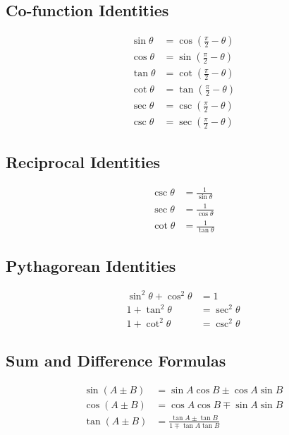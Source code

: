 \documentclass[12pt]{article}
\begin{document}
\subsection*{Co-function Identities}

\begin{align}
  \sin \theta &= \cos \left( \frac{\pi}{2} - \theta \right)\\
  \cos \theta &= \sin \left( \frac{\pi}{2} - \theta \right) \\
  \tan \theta &= \cot \left( \frac{\pi}{2} - \theta \right) \\
  \cot \theta &= \tan \left( \frac{\pi}{2} - \theta \right) \\
  \sec \theta &= \csc \left( \frac{\pi}{2} - \theta \right) \\
  \csc \theta &= \sec \left( \frac{\pi}{2} - \theta \right)
\end{align}

\vspace{1cm}
\noindent
\begin{minipage}[t]{0.45\textwidth}
\subsection*{Reciprocal Identities}

\begin{align}
  \csc \theta &= \frac{1}{\sin \theta} \\
  \sec \theta &= \frac{1}{\cos \theta} \\
  \cot \theta &= \frac{1}{\tan \theta}
\end{align}
\end{minipage}%
\hfill
\begin{minipage}[t]{0.45\textwidth}
\subsection*{Pythagorean Identities}
\begin{align}
  \sin^2 \theta + \cos^2 \theta &= 1 \\
  1 + \tan^2 \theta &= \sec^2 \theta \\
  1 + \cot^2 \theta &= \csc^2 \theta
\end{align}
\end{minipage}

\subsection*{Sum and Difference Formulas}
\begin{align}
  \sin(A \pm B) &= \sin A \cos B \pm \cos A \sin B \\
  \cos(A \pm B) &= \cos A \cos B \mp \sin A \sin B \\
  \tan(A \pm B) &= \frac{\tan A \pm \tan B}{1 \mp \tan A \tan B}
\end{align}
\end{document}
